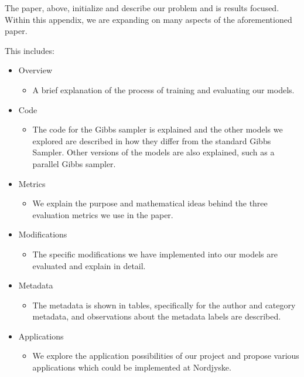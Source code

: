 The paper, above, initialize and describe our problem and is results focused.
Within this appendix, we are expanding on many aspects of the aforementioned paper.

This includes:
\begin{itemize}
	\item Overview
	\begin{itemize}
		\item A brief explanation of the process of training and evaluating our models.
	\end{itemize}
	\item Code
	\begin{itemize}
		\item The code for the Gibbs sampler is explained and the other models we explored are described in how they differ from the standard Gibbs Sampler. 
		Other versions of the models are also explained, such as a parallel Gibbs sampler.
	\end{itemize}
	\item Metrics 
	\begin{itemize}
		\item We explain the purpose and mathematical ideas behind the three evaluation metrics we use in the paper.
	\end{itemize}
	\item Modifications 
	\begin{itemize}
		\item The specific modifications we have implemented into our models are evaluated and explain in detail.
	\end{itemize}
	\item Metadata
	\begin{itemize}
		\item The metadata is shown in tables, specifically for the author and category metadata, and observations about the metadata labels are described.
	\end{itemize}
	\item Applications
	\begin{itemize}
		\item We explore the application possibilities of our project and propose various applications which could be implemented at Nordjyske.
	\end{itemize}
\end{itemize}
